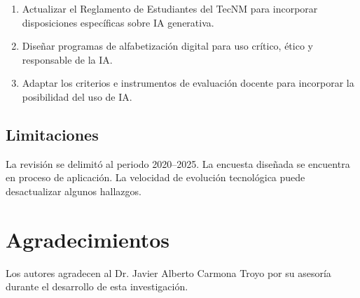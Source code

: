 \documentclass[review]{elsarticle}
\begin{document}
	\begin{enumerate}
		\item Actualizar el Reglamento de Estudiantes del TecNM para incorporar disposiciones específicas sobre IA generativa.
		\item Diseñar programas de alfabetización digital para uso crítico, ético y responsable de la IA.
		\item Adaptar los criterios e instrumentos de evaluación docente para incorporar la posibilidad del uso de IA.
	\end{enumerate}
	
	\subsection{Limitaciones}
	
	La revisión se delimitó al periodo 2020--2025. La encuesta diseñada se encuentra en proceso de aplicación. La velocidad de evolución tecnológica puede desactualizar algunos hallazgos.
	
	\section{Agradecimientos}
	
	Los autores agradecen al Dr. Javier Alberto Carmona Troyo por su asesoría durante el desarrollo de esta investigación.
	
	
	
\end{document}
